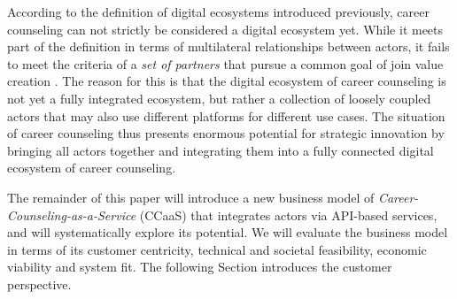 According to the definition of digital ecosystems introduced previously, career counseling can not strictly be considered
a digital ecosystem yet. While it meets part of the definition in terms of multilateral relationships between actors, it
fails to meet the criteria of a \textit{set of partners} that pursue a common goal of join value creation \citep{adnerEcosystemStructureActionable2017}.
The reason for this is that the digital ecosystem of career counseling is not yet a fully integrated ecosystem, but rather
a collection of loosely coupled actors that may also use different platforms for different use cases. The situation of 
career counseling thus presents enormous potential for strategic innovation by bringing all actors together and integrating
them into a fully connected digital ecosystem of career counseling.

The remainder of this paper will introduce a new business model of \textit{Career-Counseling-as-a-Service} (CCaaS) that
integrates actors via API-based services, and will systematically explore its potential. We will evaluate the business
model in terms of its customer centricity, technical and societal feasibility, economic viability and system fit. The
following Section introduces the customer perspective.